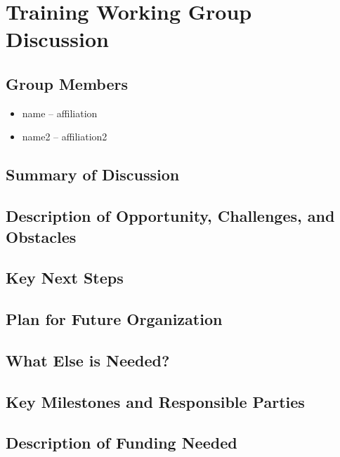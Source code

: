 \section{Training Working Group Discussion}
\label{sec:appendix_training}

\subsection{Group Members}

\begin{itemize}
\item name -- affiliation
\item name2 -- affiliation2
\end{itemize}

\subsection{Summary of Discussion}

\subsection{Description of Opportunity, Challenges, and Obstacles}


\subsection{Key Next Steps}


\subsection{Plan for Future Organization}


\subsection{What Else is Needed?}


\subsection{Key Milestones and Responsible Parties}


\subsection{Description of Funding Needed}
